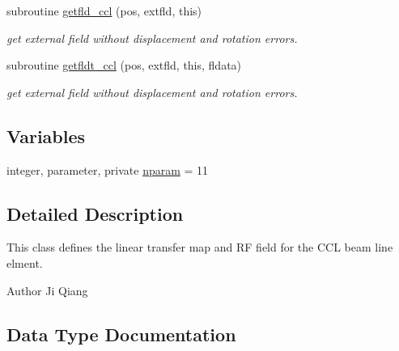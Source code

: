 \begin{DoxyCompactItemize}
subroutine \mbox{\hyperlink{namespacecclclass_a6c8d8825e6d50c30ba91c90892619a5b}{getfld\+\_\+ccl}} (pos, extfld, this)
\begin{DoxyCompactList}\small\item\em get external field without displacement and rotation errors. \end{DoxyCompactList}\item 
subroutine \mbox{\hyperlink{namespacecclclass_a4b07c783aa0e272c4924db67320c70d3}{getfldt\+\_\+ccl}} (pos, extfld, this, fldata)
\begin{DoxyCompactList}\small\item\em get external field without displacement and rotation errors. \end{DoxyCompactList}\end{DoxyCompactItemize}
\subsection*{Variables}
\begin{DoxyCompactItemize}
\item 
integer, parameter, private \mbox{\hyperlink{namespacecclclass_adeb399ff41e54cda7bdefa51063c0de6}{nparam}} = 11
\end{DoxyCompactItemize}


\subsection{Detailed Description}
This class defines the linear transfer map and RF field for the C\+CL beam line elment. 

\begin{DoxyAuthor}{Author}
Ji Qiang 
\end{DoxyAuthor}


\subsection{Data Type Documentation}
\label{structcclclass_1_1ccl}

